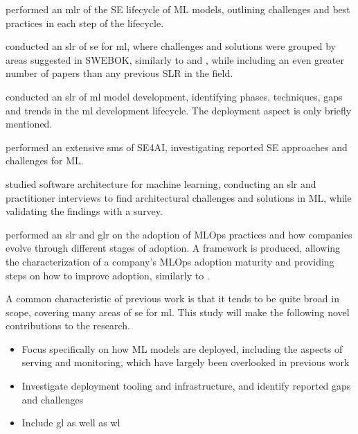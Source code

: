 \textcite{John2021} performed an \acrshort{mlr} of the SE lifecycle of ML models, outlining challenges and best practices in each step of the lifecycle.

\textcite{Giray2021} conducted an \acrshort{slr} of \acrshort{se} for \acrshort{ml}, where challenges and solutions were grouped by areas suggested in SWEBOK, similarly to \cite{Kumeno2020} and \cite{Nascimento2020}, while including an even greater number of papers than any previous SLR in the field.

\textcite{Lorenzoni2021} conducted an \acrshort{slr} of \acrshort{ml} model development, identifying phases, techniques, gaps and trends in the \acrshort{ml} development lifecycle.
The deployment aspect is only briefly mentioned.

\textcite{MartinezFernandez2021} performed an extensive \acrshort{sms} of SE4AI, investigating reported SE approaches and challenges for ML.

\textcite{Serban2021} studied software architecture for machine learning, conducting an \acrshort{slr} and practitioner interviews to find architectural challenges and solutions in ML, while validating the findings with a survey.

\textcite{John2021a} performed an \acrshort{slr} and \acrshort{glr} on the adoption of MLOps practices and how companies evolve through different stages of adoption.
A framework is produced, allowing the characterization of a company's MLOps adoption maturity and providing steps on how to improve adoption, similarly to \cite{Lwakatare2020a}.

A common characteristic of previous work is that it tends to be quite broad in scope, covering many areas of \acrshort{se} for \acrshort{ml}.
This study will make the following novel contributions to the research.
\begin{itemize}
    \item Focus specifically on how ML models are deployed, including the aspects of serving and monitoring, which have largely been overlooked in previous work
    \item Investigate deployment tooling and infrastructure, and identify reported gaps and challenges
    \item Include \acrshort{gl} as well as \acrshort{wl}
\end{itemize}

